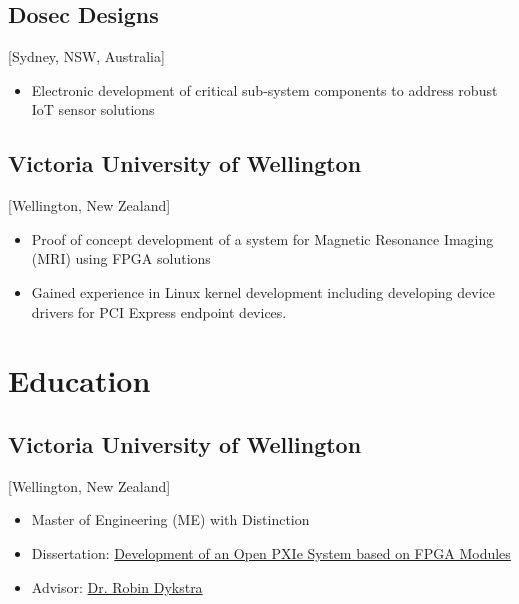 \documentclass{mycv}
\begin{document}
\subsection{Dosec Designs}[Sydney, NSW, Australia]
\begin{positions}
\end{positions}

\begin{itemize}[noitemsep]
  \item Electronic development of critical sub-system components to address robust IoT sensor solutions
\end{itemize}

\subsection{Victoria University of Wellington}[Wellington, New Zealand]
\begin{positions}
\end{positions}

\begin{itemize}[noitemsep]
  \item Proof of concept development of a system for Magnetic Resonance Imaging (MRI) using FPGA solutions
  \item Gained experience in Linux kernel development including developing device drivers for PCI Express endpoint devices.
\end{itemize}

\section{Education}

\subsection{Victoria University of Wellington}[Wellington, New Zealand]
\vspace{-\parskip}%
\begin{itemize}[label={}]
  \item Master of Engineering (ME) with Distinction 
  \item Dissertation: \href{https://tewaharoa.victoria.ac.nz/discovery/fulldisplay?docid=alma99178858497202386&context=L&vid=64VUW_INST:VUWNUI&search_scope=MyInst_and_CI&tab=all&lang=en}{Development of an Open PXIe System based on FPGA Modules}
  \item Advisor: \href{https://people.wgtn.ac.nz/robin.dykstra}{Dr. Robin Dykstra}
\end{itemize}
\end{document}
